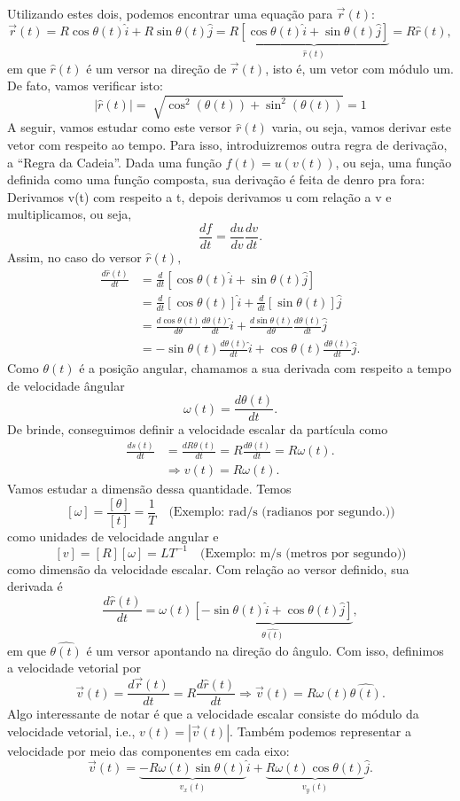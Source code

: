 \documentclass[physics_notes.tex]{subfiles}
\begin{document}
Utilizando estes dois, podemos encontrar uma equação para $\vec{r}(t)$:
$$
	\vec{r}(t) = R\cos{\theta(t)}\hat{i} + R\sin{\theta(t)}\hat{j} = R\underbrace{[\cos{\theta(t)}\hat{i} + \sin{\theta(t)}\hat{j}]}_{\hat{r}(t)}
	= R\hat{r}(t),
$$
em que $\hat{r}(t)$ é um versor na direção de $\vec{r}(t)$, isto é, um vetor com módulo um. De fato, vamos verificar isto:
$$
	|\hat{r}(t)| = \sqrt[]{\cos^{2}(\theta(t)) + \sin^{2}(\theta(t))} = 1
$$
A seguir, vamos estudar como este versor $\hat{r}(t)$ varia, ou seja, vamos derivar este vetor com respeito ao tempo. Para isso,
introduizremos outra regra de derivação, a ``Regra da Cadeia''. Dada uma função $f(t) = u(v(t))$, ou seja, uma função
definida como uma função composta, sua derivação é feita de denro pra fora: Derivamos v(t) com respeito a t, depois derivamos
u com relação a v e multiplicamos, ou seja,
$$
	\boxed{\frac{df}{dt} = \frac{du}{dv}\frac{dv}{dt}}.
$$
Assim, no caso do versor $\hat{r}(t),$
\begin{align*}
	\frac{d\hat{r}(t)}{dt} & = \frac{d}{dt}[\cos{\theta(t)}\hat{i} + \sin{\theta(t)}\hat{j}]                                                               \\
	                       & = \frac{d}{dt}[\cos{\theta(t)}]\hat{i} + \frac{d}{dt}[\sin{\theta(t)}]\hat{j}                                                 \\
	                       & = \frac{d\cos{\theta(t)}}{d\theta}\frac{d\theta(t)}{dt}\hat{i} + \frac{d\sin{\theta(t)}}{d\theta}\frac{d\theta(t)}{dt}\hat{j} \\
	                       & = -\sin{\theta(t)}\frac{d\theta(t)}{dt}\hat{i} + \cos{\theta(t)}\frac{d\theta(t)}{dt}\hat{j}.
\end{align*}
Como $\theta(t)$ é a posição angular, chamamos a sua derivada com respeito a tempo de velocidade ângular
$$
	\boxed{\omega(t) = \frac{d\theta(t)}{dt}.}
$$
De brinde, conseguimos definir a velocidade escalar da partícula como
\begin{align*}
	\frac{ds(t)}{dt} & = \frac{dR\theta(t)}{dt} = R \frac{d\theta(t)}{dt} = R\omega(t). \\
	                 & \Rightarrow \boxed{v(t) = R\omega(t).}
\end{align*}
Vamos estudar a dimensão dessa quantidade. Temos
$$
	[\omega] = \frac{[\theta]}{[t]} = \frac{1}{T} \quad \text{(Exemplo: rad/s (radianos por segundo.))}
$$
como unidades de velocidade angular e
$$
	[v] = [R][\omega] = LT^{-1} \quad \text{(Exemplo: m/s (metros por segundo))}
$$
como dimensão da velocidade escalar. Com relação ao versor definido, sua derivada é
$$
	\frac{d\hat{r}(t)}{dt} = \omega(t)\underbrace{[-\sin{\theta(t)}\hat{i}+\cos{\theta(t)}\hat{j}]}_{\hat{\theta(t)}},
$$
em que $\hat{\theta(t)}$ é um versor apontando na direção do ângulo. Com isso, definimos a velocidade vetorial por
$$
	\vec{v}(t) = \frac{d \vec{r}(t)}{dt} = R \frac{d\hat{r}(t)}{dt} \Rightarrow \vec{v}(t) = R\omega(t)\hat{\theta(t)}.
$$
Algo interessante de notar é que a velocidade escalar consiste do módulo da velocidade vetorial, i.e., $v(t) = |\vec{v}(t)|.$
Também podemos representar a velocidade por meio das componentes em cada eixo:
$$
	\vec{v}(t) = \underbrace{-R\omega(t)\sin{\theta(t)}}_{v_{x}(t)}\hat{i} + \underbrace{R\omega(t)\cos{\theta(t)}}_{v_{y}(t)}\hat{j}.
$$
\end{document}
